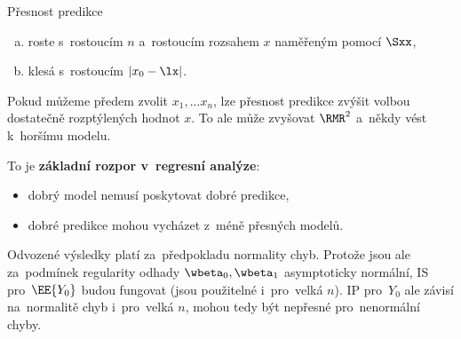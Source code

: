 \begin{remark}
	Přesnost predikce \begin{enumerate}[a)]
		\item roste s~rostoucím $n$ a~rostoucím rozsahem $x$ naměřeným pomocí $\Sxx$,
		\item klesá s~rostoucím $|x_0-\lx|$.
	\end{enumerate}
Pokud můžeme předem zvolit $x_1,...x_n$, lze přesnost predikce zvýšit volbou dostatečně rozptýlených hodnot $x$. To ale může zvyšovat $\RMR^2$ a~někdy vést k~horšímu modelu.

To je \textbf{základní rozpor v~regresní analýze}:\begin{itemize}
	\item dobrý model nemusí poskytovat dobré predikce,
	\item dobré predikce mohou vycházet z~méně přesných modelů.
\end{itemize}
\end{remark}
\begin{remark}
	Odvozené výsledky platí za~předpokladu normality chyb. Protože jsou ale za~podmínek regularity odhady $\wbeta_0,\wbeta_1$ asymptoticky normální, IS pro~$\EE{Y_0}$ budou fungovat (jsou použitelné i~pro~velká $n$). IP pro~$Y_0$ ale závisí na~normalitě  chyb i~pro~velká $n$, mohou tedy být nepřesné pro~nenormální chyby.
\end{remark}
